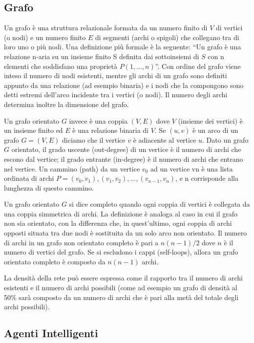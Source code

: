 \documentclass[11pt]{article}
\begin{document}
\subsection{Grafo}

Un grafo è una struttura relazionale formata da un numero finito di $V$ di vertici (o nodi) e un numero finito $E$ di segmenti (archi o spigoli) che collegano tra di loro uno o più nodi.
Una definizione più formale è la seguente: “Un grafo è una relazione n-aria su un insieme finito S definita dai sottoinsiemi di $S$ con n elementi che soddisfano una proprietà $P(1,...,n)$”.
Con ordine del grafo viene inteso il numero di nodi esistenti, mentre gli archi di un grafo sono definiti appunto da una relazione (ad esempio binaria) e i nodi che la compongono sono detti estremi dell'arco incidente tra i vertici (o nodi). Il numero degli archi determina inoltre la dimensione del grafo. \cite{IntroToAlgorithms}

Un grafo orientato $G$ invece è una coppia $(V,E)$ dove $V$ (insieme dei vertici) è un insieme finito ed $E$ è una relazione binaria di $V$.
Se $(u,v)$ è un arco di un grafo $G = (V,E)$ diciamo che il vertice $v$ è adiacente al vertice $u$.
Dato un grafo $G$ orientato, il grado uscente (out-degree) di un vertice è il numero di archi che escono dal vertice; il grado entrante (in-degree) è il numero di archi che entrano nel vertice.
Un cammino (path) da un vertice $v_0$ ad un vertice vn è una lista ordinata di archi $P={(v_0,v_1),(v_1,v_2), … , (v_{n-1}, v_n)}$, e n corrisponde alla lunghezza di questo cammino.

Un grafo orientato $G$ si dice completo quando ogni coppia di vertici è collegata da una coppia simmetrica di archi. La definizione è analoga al caso in cui il grafo non sia orientato, con la differenza che, in quest'ultimo, ogni coppia di archi opposti situata tra due nodi è sostituita da un solo arco non orientato. Il numero di archi in un grafo non orientato completo è pari a $n(n-1)/2$ dove $n$ è il numero di vertici del grafo. Se si escludono i cappi (self-loops), allora un grafo orientato completo è composto da $n(n-1)$ archi.

La densità della rete può essere espressa come il rapporto tra il numero di archi esistenti e il numero di archi possibili (come ad esempio un grafo di densità al 50\% sarà composto da un numero di archi che è pari alla metà del totale degli archi possibili). \cite{NetworkScience}

\subsection{Agenti Intelligenti}
\end{document}
